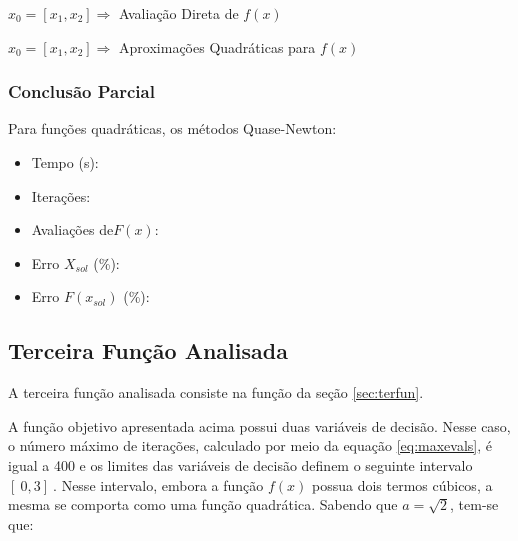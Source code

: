         \begin{minipage}{\linewidth}
            \centering
            $x_0=[x_1,x_2]\Longrightarrow$  Avaliação Direta de $f(x)$
            \label{tab:tble} 
            \writetable{\tble}
            \bigskip
        \end{minipage}
        
        \begin{minipage}{\linewidth}
            \centering
            $x_0=[x_1,x_2]\Longrightarrow$  Aproximações Quadráticas para $f(x)$
            \label{tab:tblf} 
            \writetable{\tblf}
            \bigskip
        \end{minipage}

         \subsubsection{Conclusão Parcial}
            Para funções quadráticas, os métodos Quase-Newton:
            \begin{itemize}
            \item {Tempo (s):} 
            \item {Iterações:} 
            \item {Avaliações de$F(x)$:} 
            \item {Erro $X_{sol}$ (\%):} 
            \item {Erro $F(x_{sol})$ (\%):} 
            \end{itemize}        
   
    \subsection{Terceira Função Analisada}

    A terceira função analisada consiste na função da seção \ref{sec:terfun}.
    
    A função objetivo apresentada acima possui duas variáveis de decisão. Nesse caso, o número máximo de iterações, calculado por meio da equação \ref{eq:maxevals}, é igual a 400 e os limites das variáveis de decisão definem o seguinte intervalo $[\ 0 , 3 ]\ $. Nesse intervalo, embora a função $f(x)$ possua dois termos cúbicos, a mesma se comporta como uma função quadrática. Sabendo que $a=\sqrt{2}$, tem-se que:

